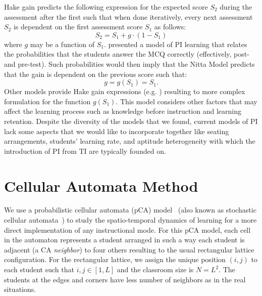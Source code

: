 \documentclass[twocolumn,secnumarabic,amssymb, nobibnotes, aps, prd]{revtex4-2}
\begin{document}
    Hake gain predicts the following expression for the expected score $S_2$ during the assessment after the first such that when done iteratively, every next assessment $S_2$ is dependent on the first assessment score $S_1$ as follows:
    \begin{equation}
        S_2 = S_1 + g\cdot(1-S_1)
        \label{eq:nitta_model}
    \end{equation}
    where $g$ may be a function of $S_1$.
    \citet{nitta2019mathematical} presented a model of PI learning that relates the probabilities that the students answer the MCQ correctly (effectively, post- and pre-test).
    Such probabilities would then imply that the Nitta Model predicts that the gain is dependent on the previous score such that:
    \begin{equation}
        g = g(S_1) = S_1.
        \label{eq:nitta_gain}
    \end{equation}
    Other models provide Hake gain expressions (e.g. \citet{pritchard2008mathematical}) resulting to more complex formulation for the function $g(S_1)$.
    This model considers other factors that may affect the learning process such as knowledge before instruction and learning retention.
    Despite the diversity of the models that we found, current models of PI lack some aspects that we would like to incorporate together like seating arrangements, students' learning rate, and aptitude heterogeneity with which the introduction of PI from TI are typically founded on.
    
\section{Cellular Automata Method}

    We use a probabilistic cellular automata (pCA) model~\cite{SelfSPP} (also known as stochastic cellular automata~\cite{arciaga2009experimental,Batac2009,louis2018probabilistic,Fernandez2018}) to study the spatio-temporal dynamics of learning for a more direct implementation of any instructional mode.
    For this pCA model, each cell in the automaton represents a student arranged in such a way each student is adjacent (a CA {\it neighbor}) to four others resulting to the usual rectangular lattice configuration.
    For the rectangular lattice, we assign the unique position $(i,j)$ to each student such that $i,j\in[1,L]$ and the classroom size is $N=L^2$.
    The students at the edges and corners have less number of neighbors as in the real situations.
\end{document}
